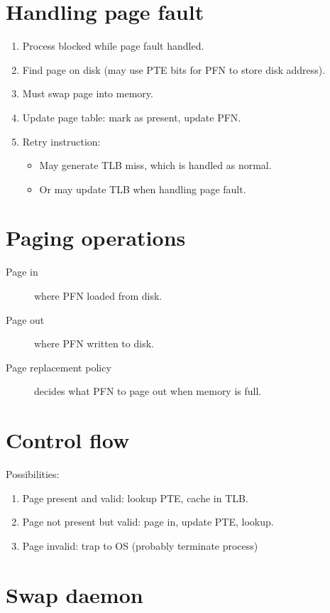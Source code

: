 \section{Handling page fault}

\begin{enumerate}
\item Process blocked while page fault handled.
\item Find page on disk (may use PTE bits for PFN to store disk address).
\item Must swap page into memory.
\item Update page table: mark as present, update PFN.
\item Retry instruction:
  \begin{itemize}
  \item May generate TLB miss, which is handled as normal.
  \item Or may update TLB when handling page fault.
  \end{itemize}
\end{enumerate}

\section{Paging operations}

\begin{description}
\item[Page in] where PFN loaded from disk.
\item[Page out] where PFN written to disk.
\item[Page replacement policy] decides what PFN to page out when memory is full.
\end{description}

\section{Control flow}

Possibilities:

\begin{enumerate}
\item Page present and valid: lookup PTE, cache in TLB.
\item Page not present but valid: page in, update PTE, lookup.
\item Page invalid: trap to OS (probably terminate process)
\end{enumerate}

\section{Swap daemon}

